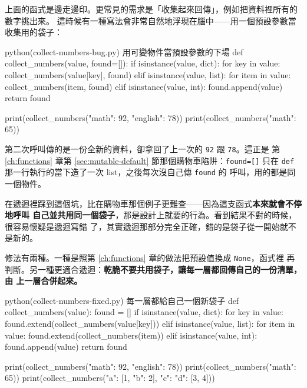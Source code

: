上面的函式是邊走邊印。更常見的需求是「收集起來回傳」，例如把資料裡所有的數字挑出來。
這時候有一種寫法會非常自然地浮現在腦中——用一個預設參數當收集用的袋子：

\begin{example}{python}{(collect-numbers-bug.py) 用可變物件當預設參數的下場}
def collect_numbers(value, found=[]):
    if isinstance(value, dict):
        for key in value:
            collect_numbers(value[key], found)
    elif isinstance(value, list):
        for item in value:
            collect_numbers(item, found)
    elif isinstance(value, int):
        found.append(value)
    return found


print(collect_numbers({"math": 92, "english": 78}))
print(collect_numbers({"math": 65}))
\end{example}

\iosample{}{[92, 78] \\{} [92, 78, 65] \\}

第二次呼叫傳的是一份全新的資料，卻拿回了上一次的 \texttt{92} 跟 \texttt{78}。這正是
第 \ref{ch:functions} 章第 \ref{sec:mutable-default} 節那個購物車陷阱：\texttt{found=[]}
只在 \texttt{def} 那一行執行的當下造了一次 list，之後每次沒自己傳 \texttt{found} 的
呼叫，用的都是同一個物件。

在遞迴裡踩到這個坑，比在購物車那個例子更難查——因為這支函式\textbf{本來就會不停地呼叫
自己並共用同一個袋子}，那是設計上就要的行為。看到結果不對的時候，很容易懷疑是遞迴寫錯
了，其實遞迴那部分完全正確，錯的是袋子從一開始就不是新的。

修法有兩種。一種是照第 \ref{ch:functions} 章的做法把預設值換成 \texttt{None}，函式裡
再判斷。另一種更適合遞迴：\textbf{乾脆不要共用袋子，讓每一層都回傳自己的一份清單，由
上一層合併起來。}

\begin{example}{python}{(collect-numbers-fixed.py) 每一層都給自己一個新袋子}
def collect_numbers(value):
    found = []
    if isinstance(value, dict):
        for key in value:
            found.extend(collect_numbers(value[key]))
    elif isinstance(value, list):
        for item in value:
            found.extend(collect_numbers(item))
    elif isinstance(value, int):
        found.append(value)
    return found


print(collect_numbers({"math": 92, "english": 78}))
print(collect_numbers({"math": 65}))
print(collect_numbers({"a": [1, {"b": 2}], "c": {"d": [3, 4]}}))
\end{example}


